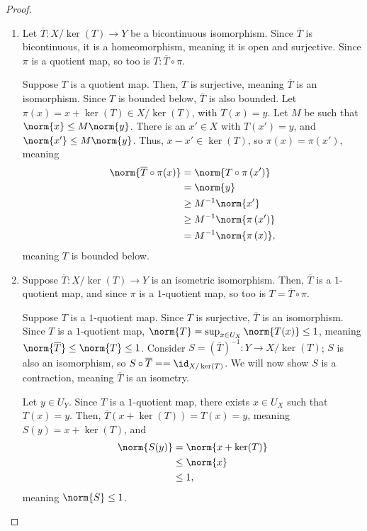 \documentclass[10pt]{mypackage}
\begin{document}
\begin{proof}\hfill
  \begin{enumerate}[(1)]
    \item Let $\overline{T}: X/\ker(T)\rightarrow Y$ be a bicontinuous isomorphism. Since $\overline{T}$ is bicontinuous, it is a homeomorphism, meaning it is open and surjective. Since $\pi$ is a quotient map, so too is $T: \overline{T}\circ \pi$.\newline

      Suppose $T$ is a quotient map. Then, $T$ is surjective, meaning $\overline{T}$ is an isomorphism. Since $T$ is bounded below, $\overline{T}$ is also bounded. Let $\pi(x) = x + \ker(T)\in X/\ker(T)$, with $T(x) = y$. Let $M$ be such that $\norm{x}\leq M\norm{y}$. There is an $x'\in X$ with $T\left(x'\right) = y$, and $\norm{x'}\leq M\norm{y}$. Thus, $x-x'\in \ker(T)$, so $\pi(x) = \pi\left(x'\right)$, meaning
      \begin{align*}
        \norm{\overline{T}\circ \pi (x)} &= \norm{T\circ \pi\left(x'\right)}\\
                                         &= \norm{y}\\
                                         &\geq M^{-1}\norm{x'}\\
                                         &\geq M^{-1}\norm{\pi\left(x'\right)}\\
                                         &= M^{-1}\norm{\pi\left(x\right)},
      \end{align*}
      meaning $T$ is bounded below.
    \item Suppose $\overline{T}:X/\ker(T) \rightarrow Y$ is an isometric isomorphism. Then, $\overline{T}$ is a $1$-quotient map, and since $\pi$ is a $1$-quotient map, so too is $T = \overline{T}\circ \pi$.\newline

      Suppose $T$ is a $1$-quotient map. Since $T$ is surjective, $\overline{T}$ is an isomorphism. Since $T$ is a $1$-quotient map, $\norm{T} = \sup_{x\in U_X}\norm{T(x)}\leq 1$, meaning $\norm{\overline{T}}\leq \norm{T} \leq 1$. Consider $S = \left(\overline{T}\right)^{-1}: Y\rightarrow X/\ker(T)$; $S$ is also an isomorphism, so $S\circ \overline{T} = = \id_{X/\ker(T)}$. We will now show $S$ is a contraction, meaning $\overline{T}$ is an isometry.\newline

      Let $y\in U_Y$. Since $T$ is a $1$-quotient map, there exists $x\in U_X$ such that $T(x) = y$. Then, $\overline{T}\left(x + \ker(T)\right) = T(x) = y$, meaning $S(y) = x + \ker(T)$, and
      \begin{align*}
        \norm{S(y)} &= \norm{x + \ker(T)}\\
                    &\leq \norm{x}\\
                    &\leq 1,
      \end{align*}
      meaning $\norm{S} \leq 1$.
  \end{enumerate}
\end{proof}
\end{document}
